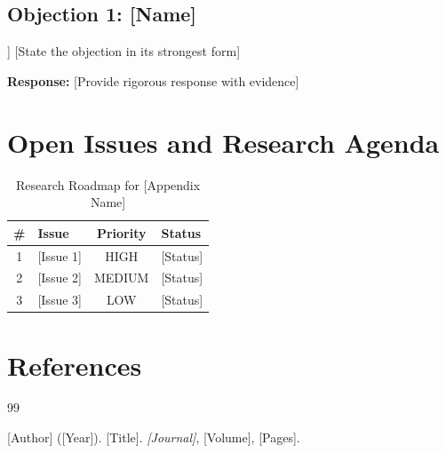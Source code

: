 \subsection{Objection 1: [Name]}

\begin{tcolorbox}[colback=red!5!white, colframe=red!50!black, 
    title=Objection: [Strongest form]]
[State the objection in its strongest form]
\end{tcolorbox}

\textbf{Response:} [Provide rigorous response with evidence]


\section{Open Issues and Research Agenda}
\label{sec:[code]-open}


\begin{table}[htbp]
\centering
\caption{Research Roadmap for [Appendix Name]}
\label{tab:[code]-roadmap}
\renewcommand{\arraystretch}{1.3}
\begin{tabular}{@{}clcl@{}}
\toprule
\textbf{\#} & \textbf{Issue} & \textbf{Priority} & \textbf{Status} \\
\midrule
1 & [Issue 1] & HIGH & [Status] \\
2 & [Issue 2] & MEDIUM & [Status] \\
3 & [Issue 3] & LOW & [Status] \\
\bottomrule
\end{tabular}
\end{table}


\section{References}
\label{sec:[code]-references}


\begin{thebibliography}{99}

\bibitem{[key]} [Author] ([Year]). [Title]. \textit{[Journal]}, [Volume], [Pages].

\end{thebibliography}


